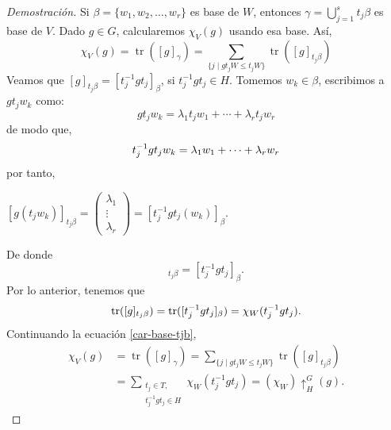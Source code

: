 \documentclass[12pt]{book}
\theoremstyle{definition}
\DeclareMathOperator{\tr}{tr}
\newcounter{in}
\begin{document}
\begin{proof}[Demostración]
  Si $\beta=\{w_{1},w_{2},\ldots,w_{r}\}$ es base de $W$, entonces $\gamma=\bigcup^{s}_{j=1}t_{j}\beta$ es
  base de $V$. Dado $g\in G$, calcularemos $\chi_{V}(g)$
  usando esa base. Así,
  \begin{equation}
    \label{car-base-tjb}    
    \chi_{V}(g)=\tr([g]_{\gamma})=\sum_{\{j\mid gt_{j}W\leq t_{j}W\}}\tr([g]_{t_{j}\beta})
  \end{equation}
  Veamos que $[g]_{t_{j}\beta}=[t^{-1}_{j}gt_{j}]_{\beta}$, si
  $t^{-1}_{j}gt_{j}\in H$.  Tomemos $w_{k}\in \beta$, escribimos a~
  $gt_{j}w_{k}$ como:
  \begin{equation*}
    gt_{j}w_{k}=\lambda_{1}t_{j}w_{1}+\cdots+\lambda_{r}t_{j}w_{r}
  \end{equation*}
  de modo que,
  \begin{equation*}
    t^{-1}_{j}gt_{j}w_{k}=\lambda_{1}w_{1}+\cdots+\lambda_{r}w_{r}\\
  \end{equation*}
  por tanto,
   \begin{center}
    $[g(t_{j}w_{k})]_{t_{j}\beta}=\begin{pmatrix}
      \lambda_{1}  \\
      \vdots  \\
      \lambda_{r}  
    \end{pmatrix}=[t^{-1}_{j}gt_{j}(w_{k})]_{\beta}$.
  \end{center}
  De donde
  \begin{equation*}
    [g]_{t_{j}\beta}=[t^{-1}_{j}gt_{j}]_{\beta}.
  \end{equation*}
  Por lo anterior, tenemos que
  \begin{equation*}
    \tr([g]_{t_{j}\beta})=\tr([t^{-1}_{j}gt_{j}]_{\beta})=\chi_{W}(t^{-1}_{j}gt_{j}).\\
  \end{equation*}
  Continuando la ecuación \ref{car-base-tjb}, 
  \begin{align*}
    \chi_{V}(g)&=\tr([g]_{\gamma})=\sum_{\{j\mid gt_{j}W\leq t_{j}W\}}\tr([g]_{t_{j}\beta})\\
    &=\sum_{\substack{t_{j}\in T,\\t^{-1}_{j}gt_{j}\in H}}\chi_{W}(t^{-1}_{j}gt_{j})=(\chi_{W})\uparrow^{G}_{H}(g).
  \end{align*}
\end{proof}
\end{document}

